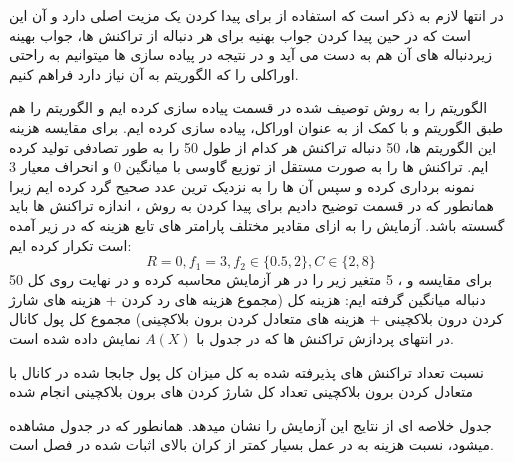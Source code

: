 در انتها لازم به ذکر است که استفاده از   برای پیدا کردن \off یک مزیت اصلی دارد و آن این است که در حین پیدا کردن جواب بهنیه برای هر دنباله از تراکنش ها، جواب بهینه زیردنباله های آن هم به دست می آید و در نتیجه در پیاده سازی ها میتوانیم به راحتی اوراکلی را که الگوریتم  به آن نیاز دارد فراهم کنیم.

الگوریتم \off را به روش توصیف شده در قسمت  پیاده سازی کرده ایم و الگوریتم \on را هم طبق الگوریتم  و با کمک از \off به عنوان اوراکل، پیاده سازی کرده ایم. 
برای مقایسه هزینه این الگوریتم ها، 50 دنباله تراکنش هر کدام از طول 50 را به طور تصادفی تولید کرده ایم. تراکنش ها را به صورت مستقل از توزیع  گاوسی با میانگین 0 و انحراف معیار 3 نمونه برداری کرده  و سپس آن ها را به نزدیک ترین عدد صحیح گرد کرده ایم زیرا همانطور که در قسمت  توضیح دادیم برای پیدا کردن \off به روش  ، اندازه تراکنش ها باید گسسته باشد.
آزمایش را به ازای مقادیر مختلف پارامتر های تابع هزینه که در زیر آمده است تکرار کرده ایم:
$$R=0,f_1=3,f_2 \in \{0.5,2\} , C \in \{2,8\}$$
برای مقایسه \on و  \off
، 5 
متغیر زیر را در هر آزمایش محاسبه کرده و در نهایت روی کل 50 دنباله میانگین گرفته ایم:
 هزینه کل (مجموع هزینه های رد کردن + هزینه های شارژ کردن درون بلاکچینی + هزینه های متعادل کردن برون بلاکچینی)
 مجموع کل پول کانال در انتهای پردازش تراکنش ها که در جدول با
$A(X)$
نمایش داده شده است.

 نسبت تعداد تراکنش های پذیرفته شده به کل
 میزان کل پول جابجا شده در کانال با متعادل کردن برون بلاکچینی
 تعداد کل شارژ کردن های برون بلاکچینی انجام شده

جدول  خلاصه ای از نتایج این آزمایش را نشان میدهد. همانطور که در جدول مشاهده میشود، نسبت هزینه \on به \off در عمل بسیار کمتر از کران بالای اثبات شده در فصل  است. 

